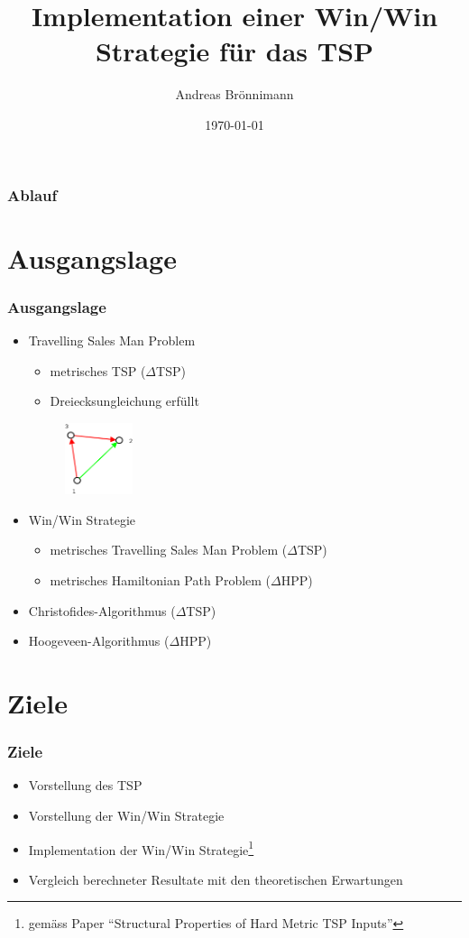 \documentclass[12pt]{beamer}
\title[Kick-Off Semesterarbeit]{Implementation einer Win/Win Strategie für das TSP}
\author{Andreas Brönnimann}
\institute{Hochschule für Technik Zürich}
\date{\today}
\begin{document}
    \begin{frame}
        \titlepage
    \end{frame}

    \begin{frame}
        \frametitle{Ablauf}
        \tableofcontents
    \end{frame}

	\section{Ausgangslage}
	\begin{frame}
        \frametitle{Ausgangslage}
		\begin{itemize}
			\item Travelling Sales Man Problem	
				\begin{itemize}
					\item metrisches TSP ($\Delta$TSP)
					\item Dreiecksungleichung erfüllt
				\end{itemize}
				\begin{figure}[H]
					\centering
					\includegraphics[width=2cm]{gfx/triangle_inequality}
				\end{figure}
			\item Win/Win Strategie
				\begin{itemize}
					\item metrisches Travelling Sales Man Problem ($\Delta$TSP)
					\item metrisches Hamiltonian Path Problem ($\Delta$HPP)
				\end{itemize}
			\item Christofides-Algorithmus ($\Delta$TSP)
			\item Hoogeveen-Algorithmus ($\Delta$HPP)
		\end{itemize}

    \end{frame}

	\section{Ziele}
	\begin{frame}
        \frametitle{Ziele}
		\begin{itemize}
			\item Vorstellung des TSP
			\item Vorstellung der Win/Win Strategie
			\item Implementation der Win/Win Strategie\footnote{gemäss Paper "`Structural Properties of Hard Metric TSP Inputs"'}
			\item Vergleich berechneter Resultate mit den theoretischen Erwartungen
		\end{itemize}
	\end{frame}
\end{document}
